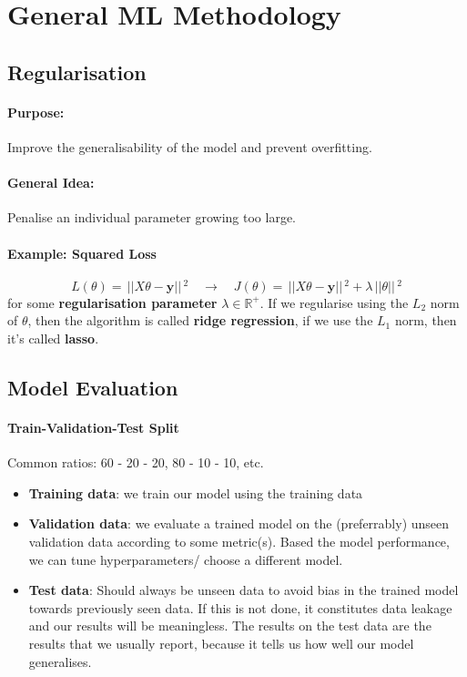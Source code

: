 \documentclass{article}
\renewcommand{\vec}[1]{\mathbf{#1}}
\renewcommand{\|}{\,\,|\,\,}
\newcommand{\norm}[1]{\,||#1||\,}
\newcommand{\Reals}{\mathbb{R}}
\begin{document}
\section{General ML Methodology}
\subsection{Regularisation}
\paragraph{Purpose:} Improve the generalisability of the model and prevent
overfitting.
\paragraph{General Idea:} Penalise an individual parameter growing too large.
\paragraph{Example: Squared Loss}
\[
  L(\theta) = \norm{X\theta - \vec{y}}^2 \quad \to \quad J(\theta) = \norm{X\theta
    - \vec{y}}^2 + \lambda\norm{\theta}^2
\]
for some \textbf{regularisation parameter} $\lambda \in \Reals^+$. If we
regularise using the $L_2$ norm of $\theta$, then the algorithm is called
\textbf{ridge regression}, if we use the $L_1$ norm, then it's called \textbf{lasso}.
\subsection{Model Evaluation}
\paragraph{Train-Validation-Test Split}
Common ratios: 60 - 20 - 20, 80 - 10 - 10, etc.
\begin{itemize}
\item \textbf{Training data}: we train our model using the training data
\item \textbf{Validation data}: we evaluate a trained model on the (preferrably)
  unseen validation data according to some metric(s). Based the model
  performance, we can tune hyperparameters/ choose a different model.
\item \textbf{Test data}: Should always be unseen data to avoid bias in the
  trained model towards previously seen data. If this is not done, it
  constitutes data leakage and our results will be meaningless. The results on
  the test data are the results that we usually report, because it tells us how
  well our model generalises.
\end{itemize}
\end{document}
